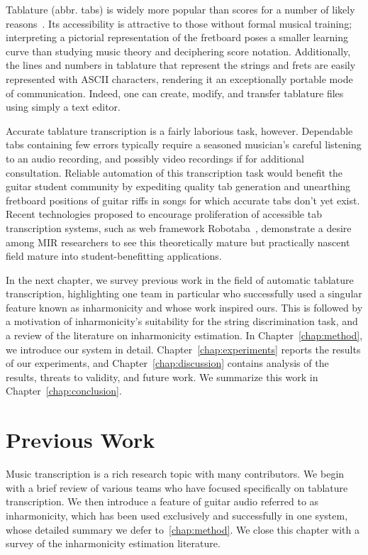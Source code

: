 \documentclass[12pt]{cmuthesis}
\begin{document}
Tablature (abbr. tabs) is widely more popular than scores for a number of likely reasons~\cite{macrae2010}. Its accessibility is attractive to those without formal musical training; interpreting a pictorial representation of the fretboard poses a smaller learning curve than studying music theory and deciphering score notation. Additionally, the lines and numbers in tablature that represent the strings and frets are easily represented with ASCII characters, rendering it an exceptionally portable mode of communication. Indeed, one can create, modify, and transfer tablature files using simply a text editor.

Accurate tablature transcription is a fairly laborious task, however. Dependable tabs containing few errors typically require a seasoned musician's careful listening to an audio recording, and possibly video recordings if for additional consultation. Reliable automation of this transcription task would benefit the guitar student community by expediting quality tab generation and unearthing fretboard positions of guitar riffs in songs for which accurate tabs don't yet exist. Recent technologies proposed to encourage proliferation of accessible tab transcription systems, such as web framework Robotaba~\cite{burlet2013}, demonstrate a desire among MIR researchers to see this theoretically mature but practically nascent field mature into student-benefitting applications. 

In the next chapter, we survey previous work in the field of automatic tablature transcription, highlighting one team in particular who successfully used a singular feature known as inharmonicity and whose work inspired ours. This is followed by a motivation of inharmonicity's suitability for the string discrimination task, and a review of the literature on inharmonicity estimation. In Chapter~\ref{chap:method}, we introduce our system in detail. Chapter~\ref{chap:experiments} reports the results of our experiments, and Chapter~\ref{chap:discussion} contains analysis of the results, threats to validity, and future work. We summarize this work in Chapter~\ref{chap:conclusion}.

\noindent
\chapter{Previous Work}
\label{chap:lit-review}
Music transcription is a rich research topic with many contributors. We begin with a brief review of various teams who have focused specifically on tablature transcription. We then introduce a feature of guitar audio referred to as inharmonicity, which has been used exclusively and successfully in one system, whose detailed summary we defer to~\ref{chap:method}. We close this chapter with a survey of the inharmonicity estimation literature.
\end{document}
